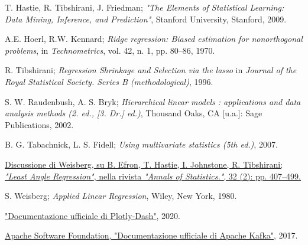 \documentclass[fleqn,10pt]{SelfArx} %
\begin{document}
\clearpage


\begin{thebibliography}{9}

T. Hastie, R. Tibshirani, J. Friedman; \textit{"The Elements of Statistical Learning: Data Mining, Inference, and Prediction"}, Stanford University, Stanford, 2009. 

A.E. Hoerl, R.W. Kennard; \textit{Ridge regression: Biased estimation for nonorthogonal problems}, in \textit{Technometrics}, vol. 42, n. 1, pp. 80–86, 1970.

R. Tibshirani; \textit{Regression Shrinkage and Selection via the lasso} in \textit{Journal of the Royal Statistical Society. Series B (methodological)}, 1996.

S. W. Raudenbush, A. S. Bryk; \textit{Hierarchical linear models : applications and data analysis methods (2. ed., [3. Dr.] ed.)}, Thousand Oaks, CA [u.a.]: Sage Publications, 2002.

B. G. Tabachnick, L. S. Fidell; \textit{Using multivariate statistics (5th ed.)}, 2007.
 
\href{https://arxiv.org/pdf/math/0406473.pdf}{Discussione di Weisberg, su B. Efron, T. Hastie, I. Johnstone, R. Tibshirani; \textit{"Least Angle Regression"}, nella rivista \textit{"Annals of Statistics."}, 32 (2): pp. 407–499.} 

S. Weisberg; \textit{Applied Linear Regression}, Wiley, New York, 1980.

\href{https://plotly.com}{"Documentazione ufficiale di Plotly-Dash"}, 2020.

\href{https://kafka.apache.org}{Apache Software Foundation, "Documentazione ufficiale di Apache Kafka"}, 2017.

\end{thebibliography}
\end{document}
